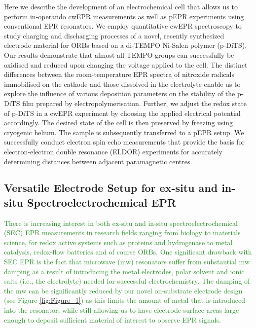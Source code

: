 \documentclass{WileyMSP-template}
\newcommand{\np}[1]{\textcolor{ForestGreen}{#1}}
\begin{document}
\bigbreak
Here we describe the development of an electrochemical cell that allows us to perform in-operando cwEPR measurements as well as pEPR experiments using conventional EPR resonators. We employ quantitative cwEPR spectroscopy to study charging and discharging processes of a novel, recently synthesized electrode material for ORBs based on a di-TEMPO Ni-Salen polymer (p-DiTS).\cite{vereshchagin2020_battandsupercaps} Our results demonstrate that almost all TEMPO groups can successfully be oxidised and reduced upon changing the voltage applied to the cell. The distinct differences between the room-temperature EPR spectra of nitroxide radicals immobilised on the cathode and those dissolved in the electrolyte enable us to explore the influence of various deposition parameters on the stability of the p-DiTS film prepared by electropolymerisation. Further, we adjust the redox state of p-DiTS in a cwEPR experiment by choosing the applied electrical potential accordingly. The desired state of the cell is then preserved by freezing using cryogenic helium. The sample is subsequently transferred to a pEPR setup. We successfully conduct electron spin echo measurements that provide the basis for electron-electron double resonance (ELDOR) experiments for accurately determining distances between adjacent paramagnetic centres.

\bigbreak
\subsection*{Versatile Electrode Setup for ex-situ and in-situ Spectroelectrochemical EPR}

\np{
There is increasing interest in both ex-situ and in-situ spectroelectrochemical (SEC) EPR measurements in research fields ranging from biology to materials science, for redox active systems such as proteins and hydrogenase to metal catalysis, redox-flow batteries and of course ORBs. One significant drawback with SEC EPR is the fact that microwave (mw) resonators suffer from substantial mw damping as a result of introducing the metal electrodes, polar solvent and ionic salts (i.e., the electrolyte) needed for successful electrochemistry. The damping of the mw can be significantly reduced by our novel on-substrate electrode design (see Figure \ref{fig:Figure_1}) as this limits the amount of metal that is introduced into the resonator, while still allowing us to have electrode surface areas large enough to deposit sufficient material of interest to observe EPR signals.
}
\end{document}
